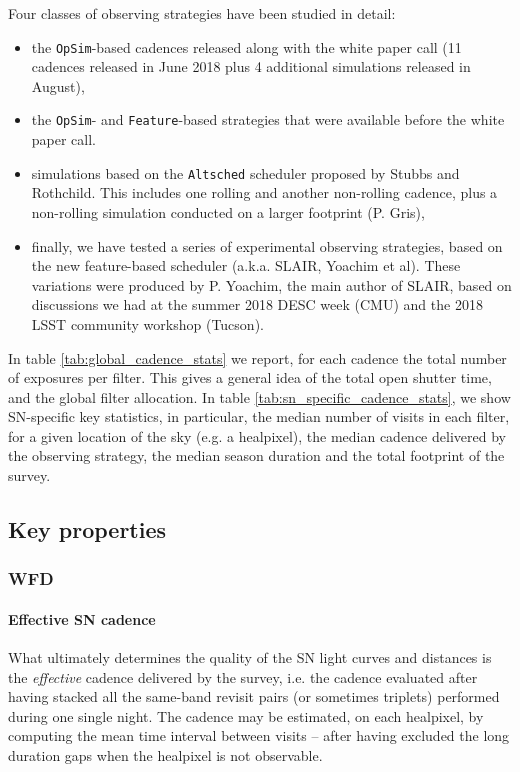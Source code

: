 \documentclass [11pt,a4paper]{article}
\begin{document}
Four classes of observing strategies have been studied in detail:
\begin{itemize}

\item the {\tt OpSim}-based cadences released along with the white
  paper call (11 cadences released in June 2018 plus 4 additional
  simulations released in August), 
  
\item the {\tt OpSim}- and {\tt Feature}-based strategies that were
  available before the white paper call. 

\item simulations based on the {\tt Altsched} scheduler proposed by
  Stubbs and Rothchild.  This includes one rolling and another
  non-rolling cadence, plus a non-rolling simulation conducted on a
  larger footprint (P. Gris),

\item finally, we have tested a series of experimental observing
  strategies, based on the new feature-based scheduler (a.k.a.  SLAIR,
  Yoachim et al). These variations were produced by P. Yoachim, the
  main author of SLAIR, based on discussions we had at the summer 2018
  DESC week (CMU) and the 2018 LSST community workshop (Tucson).
\end{itemize}

In table \ref{tab:global_cadence_stats} we report, for each cadence
the total number of exposures per filter. This gives a general idea of
the total open shutter time, and the global filter allocation.  In
table \ref{tab:sn_specific_cadence_stats}, we show SN-specific key
statistics, in particular, the median number of visits in each filter,
for a given location of the sky (e.g. a healpixel), the median cadence
delivered by the observing strategy, the median season duration and
the total footprint of the survey.


\subsection{Key properties}

\subsubsection {WFD}

\paragraph{Effective SN cadence} What ultimately determines the quality of the SN light curves
and distances is the {\em effective} cadence delivered by the survey,
i.e.  the cadence evaluated after having stacked all the same-band
revisit pairs (or sometimes triplets) performed during one single night. The cadence may be estimated, on each
healpixel, by computing the mean time interval between visits -- after
having excluded the long duration gaps when the healpixel is not
observable.
\end{document}
